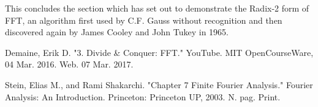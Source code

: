 \documentclass[12pt]{article}
\begin{document}
This concludes the section which has set out to demonstrate the Radix-2 form of FFT, an algorithm first used by C.F. Gauss without recognition and then discovered again by James Cooley and John Tukey in 1965. 

\newpage
\begin{thebibliography}{99}
	Demaine, Erik D. "3. Divide \& Conquer: FFT." YouTube. MIT OpenCourseWare, 04 Mar. 2016. Web. 07 Mar. 2017.
	
	  Stein, Elias M., and Rami Shakarchi. "Chapter 7 Finite Fourier Analysis." Fourier Analysis: An Introduction. Princeton: Princeton UP, 2003. N. pag. Print.
	
\end{thebibliography}
\end{document}
